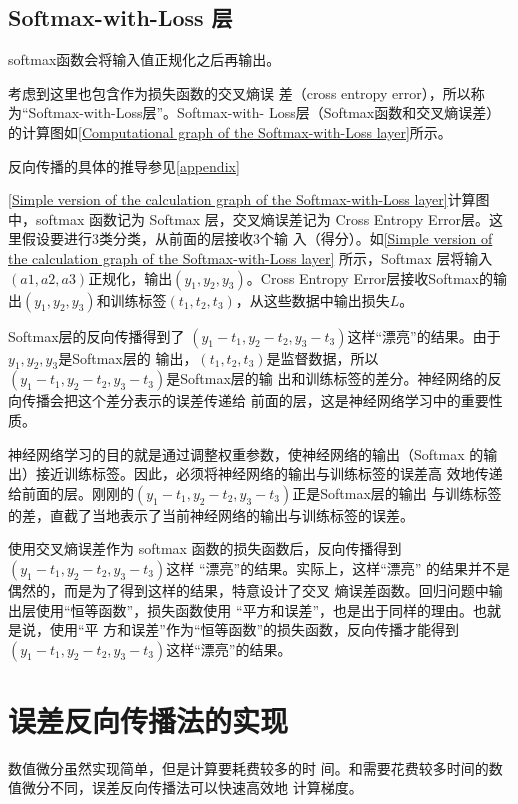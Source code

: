 

\subsection{Softmax-with-Loss 层}
softmax函数会将输入值正规化之后再输出。

考虑到这里也包含作为损失函数的交叉熵误
差（cross entropy error），所以称为“Softmax-with-Loss层”。Softmax-with-
Loss层（Softmax函数和交叉熵误差）的计算图如\autoref{Computational graph of the Softmax-with-Loss layer}所示。

反向传播的具体的推导参见\autoref{appendix}


\autoref{Simple version of the calculation graph of the Softmax-with-Loss layer}计算图中，softmax 函数记为 Softmax 层，交叉熵误差记为
Cross Entropy Error层。这里假设要进行3类分类，从前面的层接收3个输
入（得分）。如\autoref{Simple version of the calculation graph of the Softmax-with-Loss layer} 所示，Softmax 层将输入$(a1, a2, a3)$正规化，输出$(y_1,y_2, y_3)$。Cross Entropy Error层接收Softmax的输出$(y_1, y_2, y_3)$和训练标签$(t_1,t_2, t_3)$，从这些数据中输出损失$L$。

Softmax层的反向传播得到了
$(y_1 - t_1, y_2 - t_2, y_3 - t_3)$这样“漂亮”的结果。由于$y_1, y_2, y_3$是Softmax层的
输出，$(t_1, t_2, t_3)$是监督数据，所以$(y_1 - t_1, y_2 - t_2, y_3 - t_3)$是Softmax层的输
出和训练标签的差分。神经网络的反向传播会把这个差分表示的误差传递给
前面的层，这是神经网络学习中的重要性质。

神经网络学习的目的就是通过调整权重参数，使神经网络的输出（Softmax
的输出）接近训练标签。因此，必须将神经网络的输出与训练标签的误差高
效地传递给前面的层。刚刚的$(y_1 - t_1, y_2 - t_2, y_3 - t_3)$正是Softmax层的输出
与训练标签的差，直截了当地表示了当前神经网络的输出与训练标签的误差。

\begin{tcolorbox}[title=\textbf{好的损失函数的意义}]
    使用交叉熵误差作为 softmax 函数的损失函数后，反向传播得到
    $(y_1 - t_1, y_2 - t_2, y_3 - t_3)$这样 “漂亮”的结果。实际上，这样“漂亮”
    的结果并不是偶然的，而是为了得到这样的结果，特意设计了交叉
    熵误差函数。回归问题中输出层使用“恒等函数”，损失函数使用
    “平方和误差”，也是出于同样的理由。也就是说，使用“平
    方和误差”作为“恒等函数”的损失函数，反向传播才能得到$(y_1 - t_1, y_2 - t_2, y_3 - t_3)$这样“漂亮”的结果。
\end{tcolorbox}

\section{误差反向传播法的实现}
数值微分虽然实现简单，但是计算要耗费较多的时
间。和需要花费较多时间的数值微分不同，误差反向传播法可以快速高效地
计算梯度。